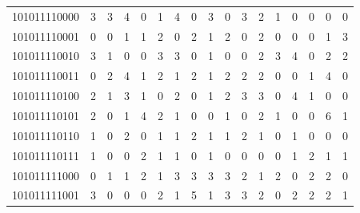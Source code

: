 \documentclass[10pt,a4paper]{article}
\begin{document}
\begin{longtable}{ |c|c|c|c|c|c|c|c|c|c|c|c|c|c|c|c|c| }
    101011110000              & 3                            & 3                                & 4                            & 0                              & 1   & 4   & 0   & 3   & 0   & 3   & 2   & 1   & 0   & 0   & 0   & 0   \\
    101011110001              & 0                            & 0                                & 1                            & 1                              & 2   & 0   & 2   & 1   & 2   & 0   & 2   & 0   & 0   & 0   & 1   & 3   \\
    101011110010              & 3                            & 1                                & 0                            & 0                              & 3   & 3   & 0   & 1   & 0   & 0   & 2   & 3   & 4   & 0   & 2   & 2   \\
    101011110011              & 0                            & 2                                & 4                            & 1                              & 2   & 1   & 2   & 1   & 2   & 2   & 2   & 0   & 0   & 1   & 4   & 0   \\
    101011110100              & 2                            & 1                                & 3                            & 1                              & 0   & 2   & 0   & 1   & 2   & 3   & 3   & 0   & 4   & 1   & 0   & 0   \\
    101011110101              & 2                            & 0                                & 1                            & 4                              & 2   & 1   & 0   & 0   & 1   & 0   & 2   & 1   & 0   & 0   & 6   & 1   \\
    101011110110              & 1                            & 0                                & 2                            & 0                              & 1   & 1   & 2   & 1   & 1   & 2   & 1   & 0   & 1   & 0   & 0   & 0   \\
    101011110111              & 1                            & 0                                & 0                            & 2                              & 1   & 1   & 0   & 1   & 0   & 0   & 0   & 0   & 1   & 2   & 1   & 1   \\
    101011111000              & 0                            & 1                                & 1                            & 2                              & 1   & 3   & 3   & 3   & 3   & 2   & 1   & 2   & 0   & 2   & 2   & 0   \\
    101011111001              & 3                            & 0                                & 0                            & 0                              & 2   & 1   & 5   & 1   & 3   & 3   & 2   & 0   & 2   & 2   & 2   & 1   \\

\end{longtable}
\end{document}
